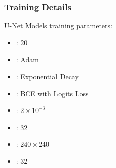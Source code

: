 \documentclass[../presentation.tex]{subfiles} %
\begin{document}
\begin{frame}[t]

	\frametitle{Training Details}

	U-Net Models training parameters:

	\begin{itemize}
		\setlength{\itemsep}{2ex}
		\item {}: $20$
		\item {}: Adam 
		\item {}: Exponential Decay 
		\item {}: BCE with Logits Loss %
		\item {}: $2 \times 10^{-3}$
		\item {}: $32$ 
		\item {}: $240 \times 240$
		\item {}: $32$
	\end{itemize}


\end{frame}
\end{document}
